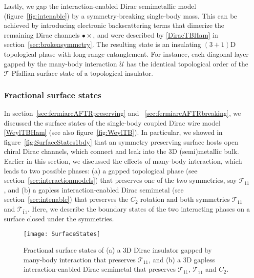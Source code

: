 Lastly, we gap the interaction-enabled Dirac semimetallic model (figure~\ref{fig:intenable}) by a symmetry-breaking single-body mass. This can be achieved by introducing electronic backscattering terms that dimerize the remaining Dirac channels {\color{blue}$\bullet\times$}, and were described by \eqref{DiracTBHam} in section~\ref{sec:brokensymmetry}. The resulting state is an insulating $(3+1)$D topological phase with long-range entanglement. For instance, each diagonal layer gapped by the many-body interaction $\mathcal{U}$ has the identical topological order of the $\mathcal{T}$-Pfaffian surface state of a topological insulator. 

\subsubsection{Fractional surface states}\label{sec:fracsurface}

In section~\ref{sec:fermiarcAFTRpreserving} and ~\ref{sec:fermiarcAFTRbreaking}, we discussed the surface states of the single-body coupled Dirac wire model \eqref{WeylTBHam} (see also figure~\ref{fig:WeylTB}). In particular, we showed in figure~\ref{fig:SurfaceStates1bdy} that an \AFTR symmetry preserving surface hosts open chiral Dirac channels, which connect and leak into the 3D (semi)metallic bulk. Earlier in this section, we discussed the effects of many-body interaction, which leads to two possible phases: (a) a gapped topological phase (see section~\ref{sec:interactionmodels}) that preserves one of the two \AFTR symmetries, say $\mathcal{T}_{11}$, and (b) a gapless interaction-enabled Dirac semimetal (see section~\ref{sec:intenable}) that preserves the $C_2$ rotation and both \AFTR symmetries $\mathcal{T}_{11}$ and $\mathcal{T}_{\bar{1}1}$. Here, we describe the boundary states of the two interacting phases on a surface closed under the symmetries.

\begin{figure}[htbp]
\centering\texttt{[image: SurfaceStates]}
\caption{Fractional surface states of (a) a 3D Dirac insulator gapped by many-body interaction that preserves $\mathcal{T}_{11}$, and (b) a 3D gapless interaction-enabled Dirac semimetal that preserves $\mathcal{T}_{11}$, $\mathcal{T}_{\bar{1}1}$ and $C_2$.}\label{fig:SurfaceStates}
\end{figure}

